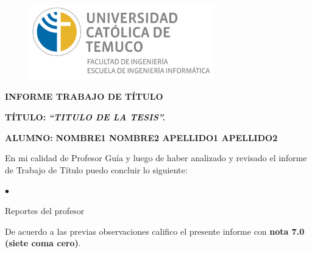 
\thispagestyle{empty}
\begin{titlepage}

{
\begin{center}
\vspace*{-1in}
\begin{figure}[htb]
\begin{center}
\includegraphics[width=8cm]{./figuras/logo_informatica.jpg}
\end{center}
\end{figure}

\vspace*{0.2in}
\textbf{ \normalsize{INFORME TRABAJO DE TÍTULO}} \\
\vspace*{0.2in}
\begin{flushleft}
\textbf{ \normalsize{TÍTULO:}} \hspace*{0.2in} \textbf{ \textit{ \normalsize{``TITULO DE LA TESIS''.}}}
\end{flushleft}
\vspace*{0.1in}
\begin{flushleft}
\textbf{ \normalsize{ALUMNO:}} \hspace*{0.2in} \textbf{ \normalsize{NOMBRE1 NOMBRE2 APELLIDO1 APELLIDO2}}
\end{flushleft}
\vspace*{0.3in}

\begin{flushleft}

\hspace{1cm} En mi calidad de Profesor Guía y luego de haber analizado y revisado el informe de Trabajo de Título puedo concluir lo siguiente:

\begin{list}{$\bullet$}{}
  \item Reportes del profesor
\end{list}

\hspace{1cm} De acuerdo a las previas observaciones califico el presente informe con \textbf {nota 7.0 (siete coma cero)}.
\end{flushleft}


\end{center}}
\end{titlepage}
